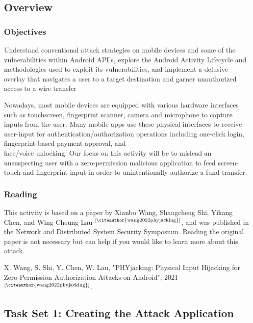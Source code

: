 \documentclass[letterpaper,12pt]{report}
\begin{document}
\subsection*{Overview}

\subsubsection*{Objectives}

Understand conventional attack strategies on mobile devices and some of the vulnerabilities within Android API's, explore the Android Activity Lifecycle and methodologies used to exploit its vulnerabilities, and implement a delusive overlay that navigates a user to a target destination and garner unauthorized access to a wire transfer

\bigskip

Nowadays, most mobile devices are equipped with various hardware interfaces such as touchscreen, fingerprint scanner, camera and microphone to capture inputs from the user. Many mobile apps use these physical interfaces to receive user-input for authentication/authorization operations including one-click login, fingerprint-based payment approval, and \\face/voice unlocking. Our focus on this activity will be to mislead an unsuspecting user with a zero-permission malicious application to feed screen-touch and fingerprint input in order to unintentionally authorize a fund-transfer.

\subsubsection*{Reading}

This activity is based on a paper by Xianbo Wang, Shangcheng Shi, Yikang Chen, and Wing Cheung Lau $^\text{[\citeauthor{wang2022phyjacking}]}$, and was published in the Network and Distributed System Security Symposium. Reading the original paper is not necessary but can help if you would like to learn more about this attack.

X. Wang, S. Shi, Y. Chen, W. Lau, "PHYjacking: Physical Input Hijacking for Zero-Permission Authorization Attacks on Android", 2021 $^\text{[\citeauthor{wang2022phyjacking}]}$.

\subsection*{Task Set 1: Creating the Attack Application}\label{sec:Task Set 1: Creating the Attack Application}
\end{document}
